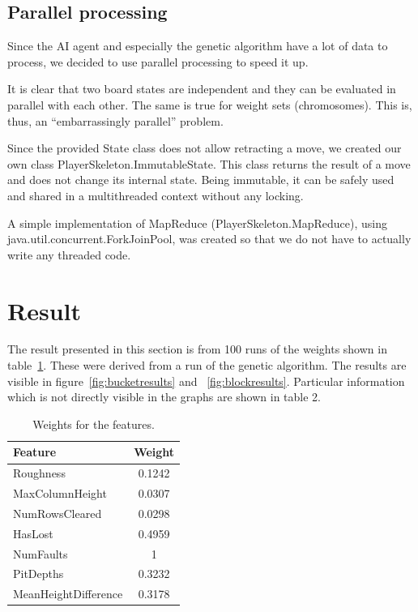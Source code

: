 \documentclass[twocolumn,12pt,journal]{IEEEtran_modified}
\begin{document}
\subsection{Parallel processing}

Since the AI agent and especially the genetic algorithm have a lot of data to process, we decided to use parallel processing to speed it up.

It is clear that two board states are independent and they can be evaluated in parallel with each other. The same is true for weight sets (chromosomes). This is, thus, an “embarrassingly parallel” problem.

Since the provided State class does not allow retracting a move, we created our own class PlayerSkeleton.ImmutableState. This class returns the result of a move and does not change its internal state. Being immutable, it can be safely used and shared in a multithreaded context without any locking.

A simple implementation of MapReduce (PlayerSkeleton.MapReduce), using java.util.concurrent.ForkJoinPool, was created so that we do not have to actually write any threaded code.

\section{Result}
The result presented in this section is from 100 runs of the weights shown in table~\ref{tab:bucketresults}. These were derived from a run of the genetic algorithm. The results are visible in figure~\ref{fig:bucketresults} and ~\ref{fig:blockresults}. Particular information which is not directly visible in the graphs are shown in table 2.
\begin{table}[h!]
\large
  \begin{center}
    \begin{tabular}{| l | c |}
    \hline
    \textbf{Feature} & \textbf{Weight} \\
    \hline
    Roughness & 0.1242  \\ \hline
    MaxColumnHeight & 0.0307  \\ \hline
    NumRowsCleared & 0.0298  \\ \hline
    HasLost & 0.4959  \\ \hline
    NumFaults & 1 \\ \hline
    PitDepths & 0.3232  \\ \hline
    MeanHeightDifference & 0.3178  \\ \hline

    \end{tabular}
  \end{center}
  \caption{Weights for the features.}
  \label{tab:bucketresults}
\end{table}
\end{document}
